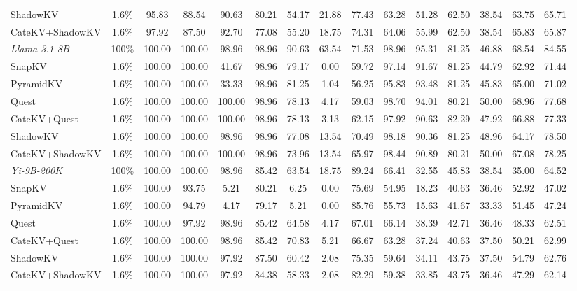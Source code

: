 \begin{table}[t]
\begin{tabular}{l|c|cccccccccccc|c}
ShadowKV & 1.6\% & 95.83 & 88.54 & 90.63 & 80.21 & 54.17 & 21.88 & 77.43 & 63.28 & 51.28 & 62.50 & 38.54 & 63.75 & 65.71 \\
CateKV+ShadowKV & 1.6\% & 97.92 & 87.50 & 92.70 & 77.08 & 55.20 & 18.75 & 74.31 & 64.06 & 55.99 & 62.50 & 38.54 & 65.83 & 65.87 \\
\midrule
\textit{Llama-3.1-8B} & 100\% & 100.00 & 100.00 & 98.96 & 98.96 & 90.63 & 63.54 & 71.53 & 98.96 & 95.31 & 81.25 & 46.88 & 68.54 & 84.55 \\
SnapKV & 1.6\% & 100.00 & 100.00 & 41.67 & 98.96 & 79.17 & 0.00 & 59.72 & 97.14 & 91.67 & 81.25 & 44.79 & 62.92 & 71.44 \\
PyramidKV & 1.6\% & 100.00 & 100.00 & 33.33 & 98.96 & 81.25 & 1.04 & 56.25 & 95.83 & 93.48 & 81.25 & 45.83 & 65.00 & 71.02 \\
Quest & 1.6\% & 100.00 & 100.00 & 100.00 & 98.96 & 78.13 & 4.17 & 59.03 & 98.70 & 94.01 & 80.21 & 50.00 & 68.96 & 77.68 \\
CateKV+Quest & 1.6\% & 100.00 & 100.00 & 100.00 & 98.96 & 78.13 & 3.13 & 62.15 & 97.92 & 90.63 & 82.29 & 47.92 & 66.88 & 77.33 \\
ShadowKV & 1.6\% & 100.00 & 100.00 & 98.96 & 98.96 & 77.08 & 13.54 & 70.49 & 98.18 & 90.36 & 81.25 & 48.96 & 64.17 & 78.50 \\
CateKV+ShadowKV & 1.6\% & 100.00 & 100.00 & 100.00 & 98.96 & 73.96 & 13.54 & 65.97 & 98.44 & 90.89 & 80.21 & 50.00 & 67.08 & 78.25 \\
\midrule
\textit{Yi-9B-200K} & 100\% & 100.00 & 100.00 & 98.96 & 85.42 & 63.54 & 18.75 & 89.24 & 66.41 & 32.55 & 45.83 & 38.54 & 35.00 & 64.52 \\
SnapKV & 1.6\% & 100.00 &	93.75 &	5.21 &	80.21 &	6.25 &	0.00 	&75.69 &	54.95 &	18.23 &	40.63 &	36.46 &	52.92 &	47.02 \\
PyramidKV & 1.6\% & 100.00 & 94.79 & 4.17 & 79.17 & 5.21 & 0.00 & 85.76 & 55.73 & 15.63 & 41.67 & 33.33 & 51.45 & 47.24 \\
Quest & 1.6\% & 100.00 & 97.92 & 98.96 & 85.42 & 64.58 & 4.17 & 67.01 & 66.14 & 38.39 & 42.71 & 36.46 & 48.33 & 62.51 \\
CateKV+Quest & 1.6\% & 100.00 & 100.00 & 98.96 & 85.42 & 70.83 & 5.21 & 66.67 & 63.28 & 37.24 & 40.63 & 37.50 & 50.21 & 62.99 \\
ShadowKV & 1.6\% & 100.00 & 100.00 & 97.92 & 87.50 & 60.42 & 2.08 & 75.35 & 59.64 & 34.11 & 43.75 & 37.50 & 54.79 & 62.76 \\
CateKV+ShadowKV & 1.6\% & 100.00 & 100.00 & 97.92 & 84.38 & 58.33 & 2.08 & 82.29 & 59.38 & 33.85 & 43.75 & 36.46 & 47.29 & 62.14 \\
\bottomrule
\end{tabular}
\label{tab:ruler-128k-appendix}
\vspace{-0.3cm}
\end{table}
